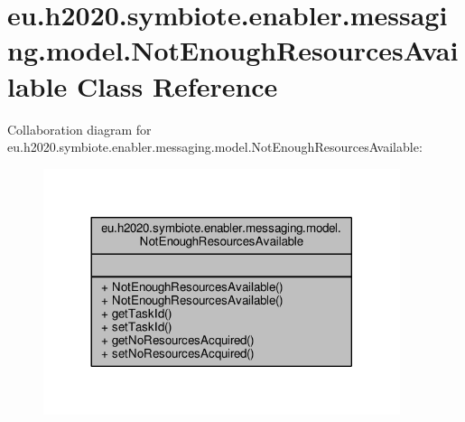 \hypertarget{classeu_1_1h2020_1_1symbiote_1_1enabler_1_1messaging_1_1model_1_1NotEnoughResourcesAvailable}{}\section{eu.\+h2020.\+symbiote.\+enabler.\+messaging.\+model.\+Not\+Enough\+Resources\+Available Class Reference}
\label{classeu_1_1h2020_1_1symbiote_1_1enabler_1_1messaging_1_1model_1_1NotEnoughResourcesAvailable}


Collaboration diagram for eu.\+h2020.\+symbiote.\+enabler.\+messaging.\+model.\+Not\+Enough\+Resources\+Available\+:\nopagebreak
\begin{figure}[H]
\begin{center}
\leavevmode
\includegraphics[width=296pt]{classeu_1_1h2020_1_1symbiote_1_1enabler_1_1messaging_1_1model_1_1NotEnoughResourcesAvailable__coll__graph}
\end{center}
\end{figure}
